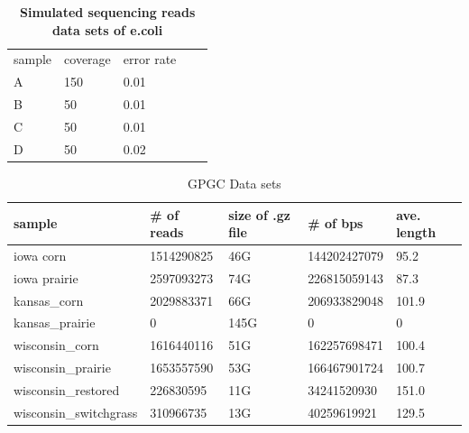 \documentclass{article}
\begin{document}
\begin{table}[h]
\caption{
\bf{Simulated sequencing reads data sets of e.coli}
}
\begin{tabular}{|l|l|l|ll}
\cline{1-3}
sample & coverage & error rate &  &  \\ \cline{1-3}
A      & 150      & 0.01       &  &  \\ \cline{1-3}
B      & 50       & 0.01       &  &  \\ \cline{1-3}
C      & 50       & 0.01       &  &  \\ \cline{1-3}
D      & 50       & 0.02       &  &  \\ \cline{1-3}
\end{tabular}
\label{table:ecoli}
\end{table}



\begin{table}[h]
\caption{GPGC Data sets}
\label{my-label}
\begin{tabular}{|l|l|l|l|l|}
\hline
sample & \# of reads & size of .gz file & \# of bps & ave. length \\ \hline
iowa corn & 1514290825 & 46G & 144202427079 & 95.2 \\ \hline
iowa prairie & 2597093273 & 74G & 226815059143 & 87.3 \\ \hline
kansas\_corn & 2029883371 & 66G & 206933829048 & 101.9 \\ \hline
kansas\_prairie & 0 & 145G & 0 & 0 \\ \hline
wisconsin\_corn & 1616440116 & 51G & 162257698471 & 100.4 \\ \hline
wisconsin\_prairie & 1653557590 & 53G & 166467901724 & 100.7 \\ \hline
wisconsin\_restored & 226830595 & 11G & 34241520930 & 151.0 \\ \hline
wisconsin\_switchgrass & 310966735 & 13G & 40259619921 & 129.5 \\ \hline
\end{tabular}
\label{table:gpgc}
\end{table}



\end{document}

